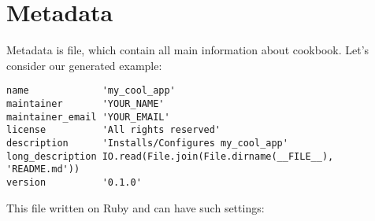 \section{Metadata}

Metadata is file, which contain all main information about cookbook. Let's consider our generated example:

\begin{lstlisting}[label=lst:cookbook-metadata1,title=my-server-cloud/site-cookbooks/my\_cool\_app/metadata.rb]
name             'my_cool_app'
maintainer       'YOUR_NAME'
maintainer_email 'YOUR_EMAIL'
license          'All rights reserved'
description      'Installs/Configures my_cool_app'
long_description IO.read(File.join(File.dirname(__FILE__), 'README.md'))
version          '0.1.0'
\end{lstlisting}

This file written on Ruby and can have such settings:

